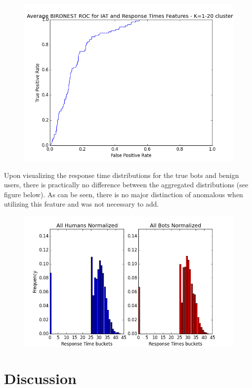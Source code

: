 \documentclass{article} %
\begin{document}
\clearpage

\begin{figure}[h]
\centering
{\includegraphics[scale=0.47]{img/bird_roc.png}}
\end{figure}

Upon visualizing the response time distributions for the true bots and benign users, there is practically no difference between the aggregated distributions (see figure below).
As can be seen, there is no major distinction of anomalous when utilizing this feature and was not necessary to add.

\begin{figure}[h]
\centering
{\includegraphics[scale=0.5]{img/bird_res_dist.png}}
\end{figure}

\section{Discussion}
\end{document}
